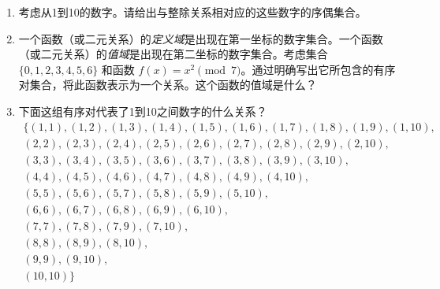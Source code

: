 \begin{enumerate}

    \item 
    
    考虑从1到10的数字。请给出与整除关系相对应的这些数字的序偶集合。
    \vfill
    
    
    \vfill
    
    \item 
     
    一个函数（或二元关系）的\emph{定义域}是出现在第一坐标的数字集合。一个函数（或二元关系）的\emph{值域}是出现在第二坐标的数字集合。考虑集合 $\{0,1,2,3,4,5,6\}$ 和函数 $f(x) = x^2 \pmod{7}$。通过明确写出它所包含的有序对集合，将此函数表示为一个关系。这个函数的值域是什么？
     \vfill
     
    \hint{
    \[ f \; = \; \{(0,0), (1,1), (2,4), (3,2), (4,2), (5,4), (6,1)\} \]
    \[ \Rng{f} \;= \; \{0,1,2,4\} \]
    
    }
    
    \vfill
    
    \workbookpagebreak
    \hintspagebreak
    
    \item 
    
    下面这组有序对代表了1到10之间数字的什么关系？
    \begin{gather*}
    \{ (1,1), (1,2), (1,3), (1,4), (1,5), (1,6), (1,7), (1,8), (1,9), (1,10), \\
    (2,2), (2,3), (2,4), (2,5), (2,6), (2,7), (2,8), (2,9), (2,10), \\
    (3,3), (3,4), (3,5), (3,6), (3,7), (3,8), (3,9), (3,10), \\
    (4,4), (4,5), (4,6), (4,7), (4,8), (4,9), (4,10), \\
    (5,5), (5,6), (5,7), (5,8), (5,9), (5,10), \\
    (6,6), (6,7), (6,8), (6,9), (6,10), \\
    (7,7), (7,8), (7,9), (7,10), \\
    (8,8), (8,9), (8,10), \\
    (9,9), (9,10), \\
    (10,10) \} 
    \end{gather*}
    
    \vfill
    

\end{enumerate}
